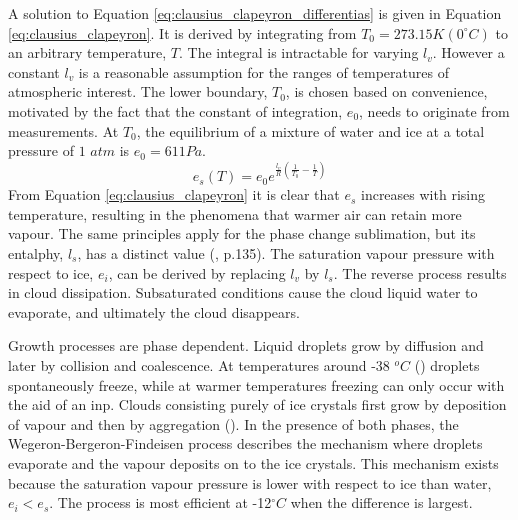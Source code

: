 A solution to Equation \eqref{eq:clausius_clapeyron_differentias} is given in Equation \eqref{eq:clausius_clapeyron}. It is derived by integrating from $T_0 = 273.15K \left(0 ^{\circ}C \right)$ to an arbitrary temperature, $T$. The integral is intractable for varying $l_v$. However a constant $l_v$ is %
a reasonable assumption for the ranges of temperatures of atmospheric interest. The lower boundary, $T_0$, is chosen based on convenience, motivated by the fact that the constant of integration,  $e_0$, needs to originate from measurements. At $T_0$, the equilibrium of a mixture of water and ice at a total pressure of $1$ $atm$ is $e_0 = 611Pa$. 
\begin{equation} \label{eq:clausius_clapeyron}
    e_s\left( T \right) = e_0 e^{\frac{l_v}{R} \left( \frac{1}{T_0} - \frac{1}{T} \right) }
\end{equation}
From Equation \eqref{eq:clausius_clapeyron} it is clear that $e_s$ increases with rising temperature, resulting in the phenomena that warmer air can retain more vapour. The same principles apply for the phase change sublimation, but its entalphy, $l_s$, has a distinct value (\cite{cloud_phys_book_johanne}, p.135). The saturation vapour pressure with respect to ice, $e_i$, can be derived by replacing $l_v$ by $l_s$. The reverse process results in cloud dissipation. 
Subsaturated conditions cause the cloud liquid water to evaporate, and ultimately the cloud disappears. 

Growth processes are phase dependent. Liquid droplets grow by diffusion and later by collision and coalescence. At temperatures around -38 $^oC$ (\cite{lohmann2016}) droplets spontaneously freeze, while at warmer temperatures freezing can only occur with the aid of an  \acrshort{inp}. Clouds consisting purely of ice crystals first grow by deposition of vapour and then by aggregation (\cite{Fowler1996LiquidAssumptions}). In the presence of both phases, the Wegeron-Bergeron-Findeisen process describes the mechanism where droplets evaporate and the vapour deposits on to the ice crystals. %
This mechanism exists because the saturation vapour pressure is lower with respect to ice than water, $e_i < e_s$. The process is most efficient at -12$^{\circ}C$ when the difference is largest.

